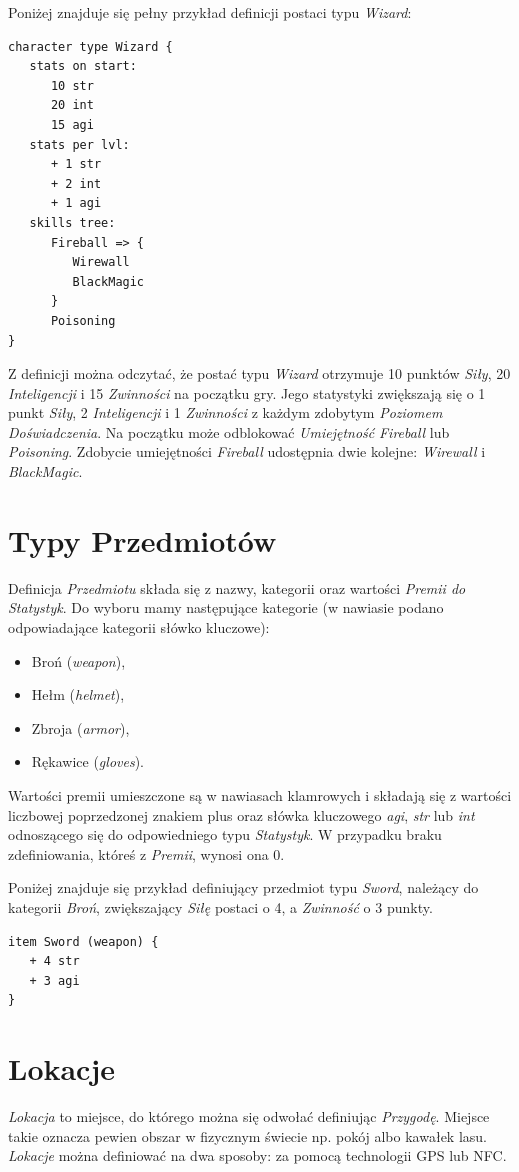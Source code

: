\documentclass[openright]{xmgr}
\begin{document}
Poniżej znajduje się pełny przykład definicji postaci typu \textit{Wizard}:
\begin{verbatim}
character type Wizard {
   stats on start:
      10 str
      20 int
      15 agi
   stats per lvl:
      + 1 str
      + 2 int
      + 1 agi
   skills tree:
      Fireball => {
         Wirewall
         BlackMagic
      }
      Poisoning
}
\end{verbatim}
Z definicji można odczytać, że postać typu \textit{Wizard} otrzymuje 10 punktów \textit{Siły}, 20 \textit{Inteligencji} i 15 \textit{Zwinności} na początku gry.
Jego statystyki zwiększają się o 1 punkt \textit{Siły}, 2 \textit{Inteligencji} i 1 \textit{Zwinności} z każdym zdobytym \textit{Poziomem Doświadczenia}.
Na początku może odblokować \textit{Umiejętność} \textit{Fireball} lub \textit{Poisoning}. Zdobycie umiejętności \textit{Fireball} udostępnia dwie kolejne: \textit{Wirewall} i \textit{BlackMagic}. 

\section{Typy Przedmiotów}
Definicja \textit{Przedmiotu} składa się z nazwy, kategorii oraz wartości \textit{Premii do Statystyk}. Do wyboru mamy następujące kategorie (w nawiasie podano odpowiadające kategorii słówko kluczowe):
\begin{itemize}
	\item Broń (\textit{weapon}),
	\item Hełm (\textit{helmet}),
	\item Zbroja (\textit{armor}),
	\item Rękawice (\textit{gloves}).
\end{itemize}
Wartości premii umieszczone są w nawiasach klamrowych i składają się z wartości liczbowej poprzedzonej znakiem plus oraz słówka kluczowego \textit{agi}, \textit{str} lub \textit{int} odnoszącego się do odpowiedniego typu \textit{Statystyk}. W przypadku braku zdefiniowania, któreś z \textit{Premii}, wynosi ona 0.

Poniżej znajduje się przykład definiujący przedmiot typu \textit{Sword}, należący do kategorii \textit{Broń}, zwiększający \textit{Siłę} postaci o 4, a \textit{Zwinność} o 3 punkty.
\begin{verbatim}
item Sword (weapon) {
   + 4 str
   + 3 agi
}
\end{verbatim}

\section{Lokacje}
\textit{Lokacja} to miejsce, do którego można się odwołać definiując \textit{Przygodę}. Miejsce takie oznacza pewien obszar w fizycznym świecie np. pokój albo kawałek lasu. \textit{Lokacje} można definiować na dwa sposoby: za pomocą technologii GPS lub NFC. 
\end{document}
